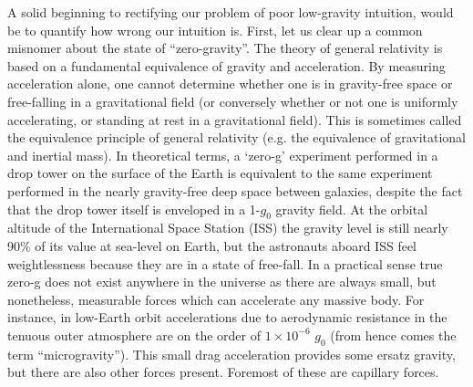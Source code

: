 \documentclass[12pt,a4paper,oneside]{book}
\begin{document}
A solid beginning to rectifying our problem of poor low-gravity intuition, would be to quantify how wrong our intuition is. First, let us clear up a common misnomer about the state of ``zero-gravity''. The theory of general relativity is based on a fundamental equivalence of gravity and acceleration. By measuring acceleration alone, one cannot determine whether one is in gravity-free space or free-falling in a gravitational field (or conversely whether or not one is uniformly accelerating, or standing at rest in a gravitational field). This is sometimes called the equivalence principle of general relativity (e.g. the equivalence of gravitational and inertial mass). In theoretical terms, a `zero-g' experiment performed in a drop tower on the surface of the Earth is equivalent to the same experiment performed in the nearly gravity-free deep space between galaxies, despite the fact that the drop tower itself is enveloped in a 1-$g_0$ gravity field. At the orbital altitude of the International Space Station (ISS) the gravity level is still nearly 90\% of its value at sea-level on Earth, but the astronauts aboard ISS feel weightlessness because they are in a state of free-fall. In a practical sense true zero-g does not exist anywhere in the universe as there are always small, but nonetheless, measurable forces which can accelerate any massive body. For instance, in low-Earth orbit accelerations due to aerodynamic resistance in the tenuous outer atmosphere are on the order of $1 \times 10^{-6}$ $g_0$ (from hence comes the term ``microgravity''). This small drag acceleration provides some ersatz gravity, but there are also other forces present. Foremost of these are capillary forces. 
\end{document}
